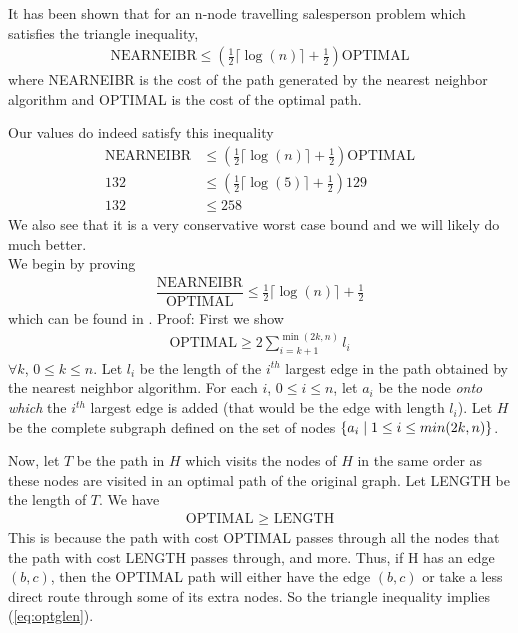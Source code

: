 It has been shown \cite{rosenkrantz74} that for an n-node travelling salesperson problem which satisfies the triangle inequality, 
\begin{align*}
\text{NEARNEIBR} \leq (\frac{1}{2} \lceil \log(n) \rceil + \frac{1}{2})\text{OPTIMAL}
\end{align*}
where NEARNEIBR is the cost of the path generated by the nearest neighbor algorithm and OPTIMAL is the cost of the optimal path. 

Our values do indeed satisfy this inequality
\begin{align*}
\text{NEARNEIBR} &\leq (\frac{1}{2} \lceil \log(n) \rceil + \frac{1}{2})\text{OPTIMAL} \\
132 &\leq (\frac{1}{2} \lceil \log(5) \rceil + \frac{1}{2})129 \\
132 &\leq 258 
\end{align*}
We also see that it is a very conservative worst case bound and we will likely do much better. \\

We begin by proving
\begin{align}
\dfrac{\text{NEARNEIBR}}{\text{OPTIMAL}} \leq \frac{1}{2} \lceil \log(n) \rceil + \frac{1}{2}
\end{align}
which can be found in \cite{rosenkrantz74}. 
Proof:
First we show
\begin{align}
\text{OPTIMAL} \geq 2 \sum^{\min(2k,n)}_{i=k+1} l_i \label{eq:showFirst}
\end{align}
$\forall k$, $0\leq k \leq n$. 
Let $l_i$ be the length of the $i^{th}$ largest edge in the path obtained by the nearest neighbor algorithm. For each $i$, $0 \leq i \leq n$, let $a_i$ be the node \textit{onto which} the $i^{th}$ largest edge is added (that would be the edge with length $l_i$). Let $H$ be the complete subgraph defined on the set of nodes $\{a_i \hspace{0.1cm} | \hspace{0.1cm} 1 \leq i \leq min(2k,n)\}$.

Now, let $T$ be the path in $H$ which visits the nodes of $H$ in the same order as these nodes are visited in an optimal path of the original graph. Let LENGTH be the length of $T$. We have 
\begin{align}
\text{OPTIMAL $\geq$ LENGTH} \label{eq:optglen}
\end{align}
This is because the path with cost OPTIMAL passes through all the nodes that the path with cost LENGTH passes through, and more. Thus, if H has an edge $(b,c)$, then the OPTIMAL path will either have the edge $(b,c)$ or take a less direct route through some of its extra nodes. So the triangle inequality implies (\ref{eq:optglen}).  
   
